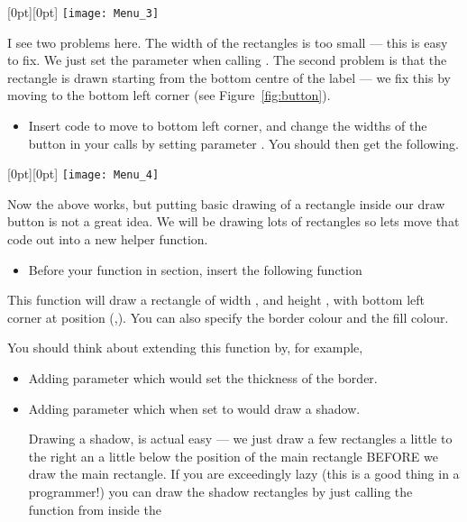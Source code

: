 \documentclass{coderdojo}
\newcommand\TODO[1]{
\begin{itemize}
\item[\todoSymbol] \color{todo} #1
\end{itemize}}
\begin{document}
\mbox{}\hfill\raisebox{0.5cm}[0pt][0pt]{%
	\texttt{[image: Menu\_3]}
}\hspace*{-1.5cm}

I see two problems here. The width of the rectangles is too small --- this is easy to fix. We just set the  parameter when calling . The second problem is that the rectangle is drawn starting from the bottom centre of the label --- we fix this by moving  to the bottom left corner (see Figure~\ref{fig:button}).

\TODO{Insert code to move  to bottom left corner, and change the widths of the 
button in your \code{drawButton} calls by setting parameter \code{w}. You should then get the following.}

\mbox{}\hfill\raisebox{0.5cm}[0pt][0pt]{%
	\texttt{[image: Menu\_4]}
}\hspace*{-1.5cm}

Now the above works, but putting basic drawing of a rectangle inside our draw button is not a great idea.  We will be drawing lots of rectangles so lets move that code out into a new helper function.

\TODO{Before your  function in \code{Define helper functions} section, insert the following function}


This function will draw a rectangle of width , and height , with bottom left corner at position (,). You can also specify the border colour and the fill colour.

\vspace{12pt}

You should think about extending this function by, for example,
\begin{itemize}
\item Adding parameter  which would set the thickness of the border.
\item Adding parameter  which when set to  would draw a shadow. 

Drawing a shadow, is actual easy --- we just draw a few rectangles a little to the right an a little below the position of the main rectangle BEFORE we draw the main rectangle. If you are exceedingly lazy (this is a good thing in a programmer!) you can draw the shadow rectangles by just calling the  function from inside the  
\end{itemize}
\newpage
\end{document}
